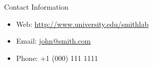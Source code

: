 \documentclass[final,hyperref={pdfpagelabels=false}]{beamer}
\begin{document}
\begin{frame}[t]
\begin{columns}[t]
\begin{column}{.465\textwidth}

\begin{block}{Contact Information}

\begin{itemize}
\item Web: \href{http://www.university.edu/smithlab}{http://www.university.edu/smithlab}
\item Email: \href{mailto:john@smith.com}{john@smith.com}
\item Phone: +1 (000) 111 1111
\end{itemize}

\end{block}


\end{column} %

\begin{column}{.015\textwidth}\end{column} %

\end{columns} %

\end{frame} %
\end{document}
